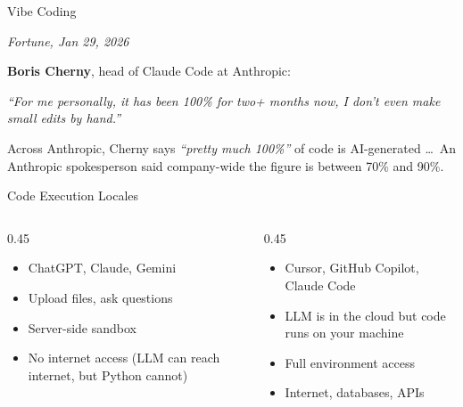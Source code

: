 \documentclass[aspectratio=169]{beamer}
\begin{document}
\begin{frame}{Vibe Coding}
\begin{shadedbox}\centerline{\textit{Fortune, Jan 29, 2026}}\end{shadedbox}
\vspace{0.5cm}

\textbf{Boris Cherny}, head of Claude Code at Anthropic:

\vspace{0.3cm}
\textit{``For me personally, it has been 100\% for two+ months now, I don't even make small edits by hand.''}

\vspace{0.3cm}
Across Anthropic, Cherny says \textit{``pretty much 100\%''} of code is AI-generated \ldots\ An Anthropic spokesperson said company-wide the figure is between 70\% and 90\%.

\end{frame}

\begin{frame}{Code Execution Locales}
\begin{columns}[T]
  \begin{column}{0.45\textwidth}
\begin{shadedbox}[title=\textbf{In the Cloud}]
\begin{itemize}\small
  \item ChatGPT, Claude, Gemini
  \item Upload files, ask questions
  \item Server-side sandbox
  \item No internet access (LLM can reach internet, but Python cannot)
\end{itemize}
\end{shadedbox}
\end{column}
\begin{column}{0.45\textwidth}
\begin{shadedbox}[title=\textbf{Locally}]
\begin{itemize}\small
  \item Cursor, GitHub Copilot, Claude Code
  \item LLM is in the cloud but code runs on your machine
  \item Full environment access
  \item Internet, databases, APIs
\end{itemize}
\end{shadedbox}
\end{column}

\end{columns}
\end{frame}
\end{document}

